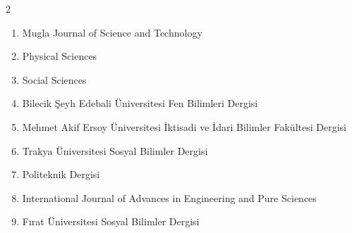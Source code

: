 \documentclass[10pt,a4paper]{article}
\begin{document}
\begin{multicols}{2}
\begin{enumerate}
\item Mugla Journal of Science and Technology
\item Physical Sciences
\item Social Sciences
\item Bilecik Şeyh Edebali Üniversitesi Fen Bilimleri Dergisi
\item Mehmet Akif Ersoy Üniversitesi İktisadi ve İdari Bilimler Fakültesi Dergisi
\item Trakya Üniversitesi Sosyal Bilimler Dergisi
\item Politeknik Dergisi
\item International Journal of Advances in Engineering and Pure Sciences
\item Fırat Üniversitesi Sosyal Bilimler Dergisi
\end{enumerate}
\end{multicols}
\end{document}
